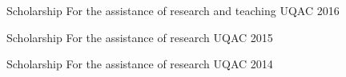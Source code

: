 

\begin{cvhonors}

  \cvhonor
    {Scholarship} %
    {For the assistance of research and teaching} %
    {UQAC} %
    {2016} %

  \cvhonor
    {Scholarship} %
    {For the assistance of research} %
    {UQAC} %
    {2015} %

  \cvhonor
    {Scholarship} %
    {For the assistance of research} %
    {UQAC} %
    {2014} %

\end{cvhonors}